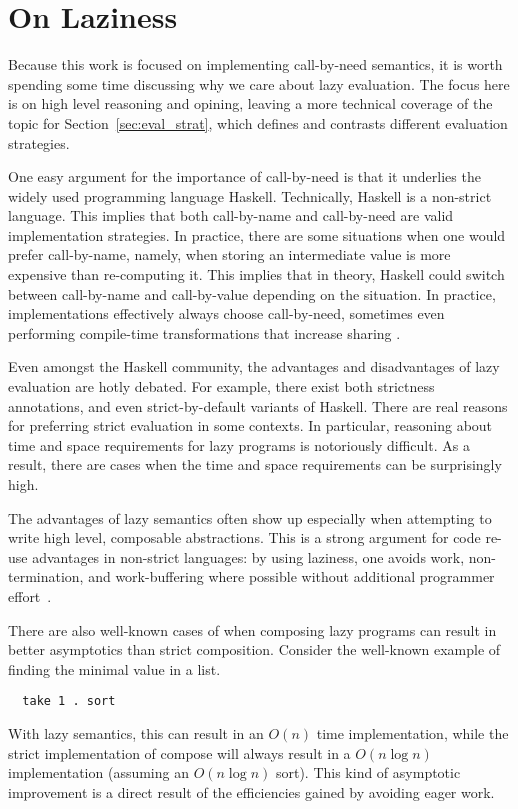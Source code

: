 \section{On Laziness}

Because this work is focused on implementing call-by-need semantics, it is worth
spending some time discussing why we care about lazy evaluation. The focus here
is on high level reasoning and opining, leaving a more technical coverage
of the topic for Section~\ref{sec:eval_strat}, which defines and contrasts
different evaluation strategies.

One easy argument for the importance of call-by-need is that it underlies the
widely used programming language Haskell. Technically, Haskell is a non-strict
language.  This implies that both call-by-name and call-by-need are valid
implementation strategies. In practice, there are some situations when one would
prefer call-by-name, namely, when storing an intermediate value is more
expensive than re-computing it. This implies that in theory, Haskell could
switch between call-by-name and call-by-value depending on the situation.  In
practice, implementations effectively always choose call-by-need, sometimes
even performing compile-time transformations that increase sharing
\cite{jones96floating}.  

Even amongst the Haskell community, the advantages and disadvantages of
lazy evaluation are hotly debated. For example, there exist both strictness
annotations, and even strict-by-default variants of Haskell. There are real
reasons for preferring strict evaluation in some contexts. In particular,
reasoning about time and space requirements for lazy programs is notoriously
difficult. As a result, there are cases when the time and space requirements can
be surprisingly high.

The advantages of lazy semantics often show up especially when attempting to
write high level, composable abstractions. This is a strong argument for code
re-use advantages in non-strict languages: by using laziness, one avoids work,
non-termination, and work-buffering where possible without additional programmer
effort~\cite{hughes1989functional}.

There are also well-known cases of when composing lazy programs can result in
better asymptotics than strict composition. Consider the well-known example of
finding the minimal value in a list. 
\begin{verbatim}
  take 1 . sort
\end{verbatim}
With lazy semantics, this can result in an $O(n)$ time implementation, while the
strict implementation of compose will always result in a $O(n \log n)$
implementation (assuming an $O(n \log n)$ sort). This kind of asymptotic
improvement is a direct result of the efficiencies gained by avoiding eager
work. 

